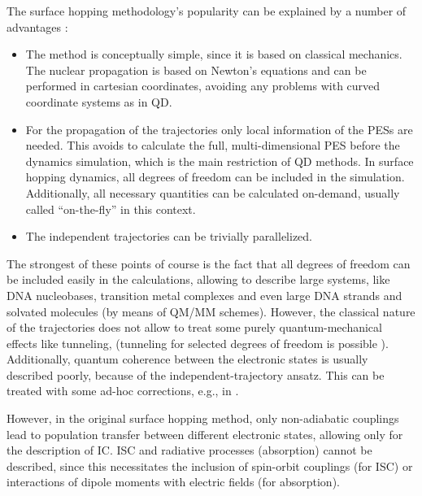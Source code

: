 \documentclass[a4paper,11pt,DIV=15,openany,twoside=false]{scrbook}
\begin{document}
The surface hopping methodology's popularity can be explained by a number of advantages \cite{Barbatti2011WCMS}:
\begin{itemize}
  \item The method is conceptually simple, since it is based on classical mechanics. The nuclear propagation is based on Newton's equations and can be performed in cartesian coordinates, avoiding any problems with curved coordinate systems as in QD.
  \item For the propagation of the trajectories only local information of the PESs are needed. This avoids to calculate the full, multi-dimensional PES before the dynamics simulation, which is the main restriction of QD methods. In surface hopping dynamics, all degrees of freedom can be included in the simulation. Additionally, all necessary quantities can be calculated on-demand, usually called ``on-the-fly'' in this context.
  \item The independent trajectories can be trivially parallelized.
\end{itemize}
The strongest of these points of course is the fact that all degrees of freedom can be included easily in the calculations, allowing to describe large systems, like DNA nucleobases, transition metal complexes and even large DNA strands and solvated molecules (by means of QM/MM schemes).
However, the classical nature of the trajectories does not allow to treat some purely quantum-mechanical effects like tunneling, (tunneling for selected degrees of freedom is possible \cite{Hammes-Schiffer1994JCP}). Additionally, quantum coherence between the electronic states is usually described poorly, because of the independent-trajectory ansatz. This can be treated with some ad-hoc corrections, e.g., in \cite{Granucci2007JCP}. 

However, in the original surface hopping method, only non-adiabatic couplings lead to population transfer between different electronic states, allowing only for the description of IC. ISC and radiative processes (absorption) cannot be described, since this necessitates the inclusion of spin-orbit couplings (for ISC) or interactions of dipole moments with electric fields (for absorption). 
\end{document}
